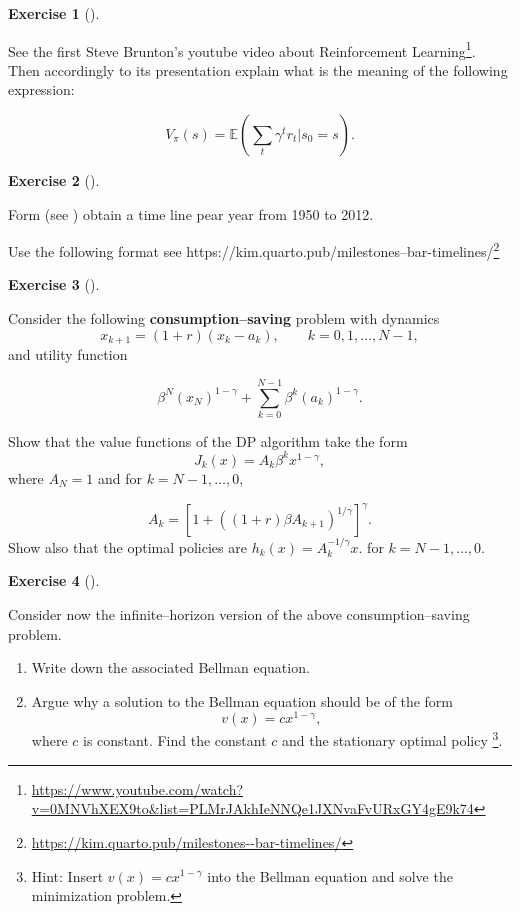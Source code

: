 \documentclass[
  letterpaper,
]{krantz}
\renewcommand{\href}[2]{#2\footnote{\url{#1}}}
\theoremstyle{plain}
\theoremstyle{definition}
\theoremstyle{definition}
\newtheorem{exercise}{Exercise}[chapter]
\theoremstyle{remark}
\begin{document}
\begin{exercise}[]\protect\hypertarget{exr-hw_001_02}{}\label{exr-hw_001_02}

See the first Steve Brunton's youtube video about
\href{https://www.youtube.com/watch?v=0MNVhXEX9to&list=PLMrJAkhIeNNQe1JXNvaFvURxGY4gE9k74}{Reinforcement
Learning}. Then accordingly to its presentation explain what is the
meaning of the following expression:

\[
  V_{\pi}(s) = \mathbb{E}
 \left(
   \sum_{t} \gamma ^ {t} r_t | s_0 = s
 \right).
\]

\end{exercise}

\begin{exercise}[]\protect\hypertarget{exr-hw_001_03}{}\label{exr-hw_001_03}

Form (see )
obtain a time line pear year from 1950 to 2012.

Use the following format
\href{https://kim.quarto.pub/milestones--bar-timelines/}{see
https://kim.quarto.pub/milestones--bar-timelines/}

\end{exercise}

\begin{exercise}[]\protect\hypertarget{exr-hw_001_04}{}\label{exr-hw_001_04}

Consider the following \textbf{consumption--saving} problem with
dynamics \[ 
  x_{k+1}
  = (1+r)(x_k-a_k),\qquad k=0,1,\ldots,N-1, 
\] and utility function

\[
  \beta^N(x_N)^{1-\gamma} 
    + \sum_{k=0}^{N-1}\beta^k (a_k)^{1-\gamma}. 
\]

Show that the value functions of the DP algorithm take the form
\[J_k(x)=A_k\beta^kx^{1-\gamma},\] where \(A_N=1\) and for
\(k=N-1,\ldots,0\),

\[  A_k = [1 + ((1+r)\beta A_{k+1})^{1/\gamma} ]^\gamma.  \] Show also
that the optimal policies are \(h_k(x)=A_k^{-1/\gamma} x\). for
\(k=N-1,\ldots,0\).

\end{exercise}

\begin{exercise}[]\protect\hypertarget{exr-hw_001_05}{}\label{exr-hw_001_05}

Consider now the infinite--horizon version of the above
consumption--saving problem.

\begin{enumerate}
\def\labelenumi{\roman{enumi})}
\item
  Write down the associated Bellman equation.
\item
  Argue why a solution to the Bellman equation should be of the form
  \[v(x)=cx^{1-\gamma},\] where \(c\) is constant. Find the constant
  \(c\) and the stationary optimal policy \footnote{Hint: Insert
    \(v(x)=cx^{1-\gamma}\) into the Bellman equation and solve the
    minimization problem.}.
\end{enumerate}

\end{exercise}
\end{document}
